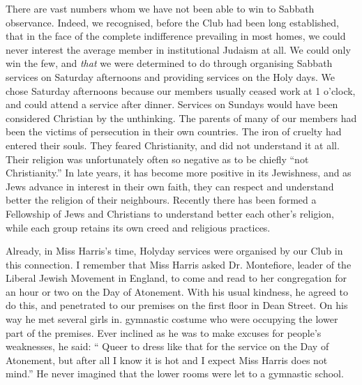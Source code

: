 There are vast numbers whom we have not been able
to win to Sabbath observance. Indeed, we recognised,
before the Club had been long established, that in the
face of the complete indifference prevailing in most
homes, we could never interest the average member in
institutional Judaism at all. We could only win the few,
and \textsl{that} we were determined to do through organising
Sabbath services on Saturday afternoons and providing
services on the Holy days. We chose Saturday afternoons
because our members usually ceased work at
1 o'clock, and could attend a service after dinner. Services
on Sundays would have been considered
Christian by the unthinking. The parents of many of our
members had been the victims of persecution in their own
countries. The iron of cruelty had entered their souls.
They feared Christianity, and did not understand it at all.
Their religion was unfortunately often so negative as to
be chiefly “not Christianity.” In late years, it has become
more positive in its Jewishness, and as Jews advance
in interest in their own faith, they can respect and understand
better the religion of their neighbours. Recently
there has been formed a Fellowship of Jews and
Christians to understand better each other’s religion, while
each group retains its own creed and religious practices.

Already, in Miss Harris’s time, Holyday services were
organised by our Club in this connection. I remember
that Miss Harris asked Dr. Montefiore, leader of the
Liberal Jewish Movement in England, to come and read
to her congregation for an hour or two on the Day of
Atonement. With his usual kindness, he agreed to do this,
and penetrated to our premises on the first floor in Dean
Street. On his way he met several girls in. gymnastic
costume who were occupying the lower part of the
premises. Ever inclined as he was to make excuses for
people’s weaknesses, he said: “ Queer to dress like that
for the service on the Day of Atonement, but after all I
know it is hot and I expect Miss Harris does not mind.”
He never imagined that the lower rooms were let to a
gymnastic school.

